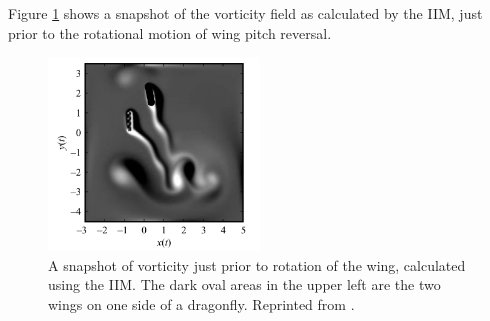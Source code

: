 Figure \ref{wingDiagram} shows a snapshot of the vorticity field as calculated by the IIM, just prior to the rotational motion of wing pitch reversal.

\begin{figure}[h]
    \centering
    \includegraphics[width=0.5\textwidth]{diagrams/InsectFlight.png}
    \caption{A snapshot of vorticity just prior to rotation of the wing, calculated using the IIM. The dark oval areas in the upper left are the two wings on one side of a dragonfly. Reprinted from \cite{bergouetal07}.}
    \label{wingDiagram}
\end{figure}

